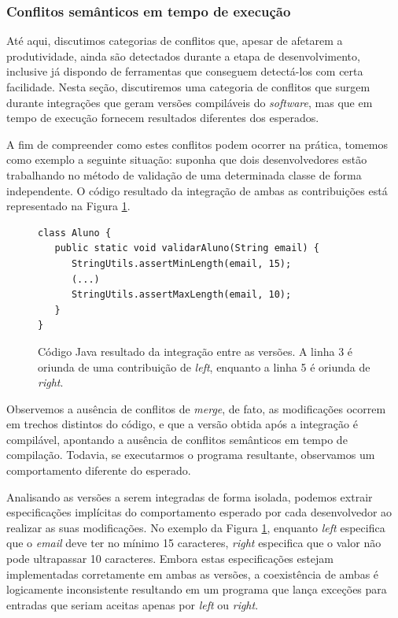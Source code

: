 \documentclass[12pt]{article}
\begin{document}
\subsubsection{Conflitos semânticos em tempo de execução}
Até aqui, discutimos categorias de conflitos que, apesar de afetarem a produtividade, ainda são detectados durante a etapa de desenvolvimento, inclusive já dispondo de ferramentas que conseguem detectá-los com certa facilidade. Nesta seção, discutiremos uma categoria de conflitos que surgem durante integrações que geram versões compiláveis do \textit{software}, mas que em tempo de execução fornecem resultados diferentes dos esperados.

A fim de compreender como estes conflitos podem ocorrer na prática, tomemos como exemplo a seguinte situação: suponha que dois desenvolvedores estão trabalhando no método de validação de uma determinada classe de forma independente. O código resultado da integração de ambas as contribuições está representado na Figura \ref{fig:dynamic1}.

\begin{figure}[H]
\begin{verbatim}
class Aluno {
   public static void validarAluno(String email) {
      StringUtils.assertMinLength(email, 15);
      (...)
      StringUtils.assertMaxLength(email, 10);
   }
}

\end{verbatim}
\caption{Código Java resultado da integração entre as versões. A linha 3 é oriunda de uma contribuição de \textit{left}, enquanto a linha 5 é oriunda de \textit{right}.}
\label{fig:dynamic1}
\end{figure}

Observemos a ausência de conflitos de \textit{merge}, de fato, as modificações ocorrem em trechos distintos do código, e que a versão obtida após a integração é compilável, apontando a ausência de conflitos semânticos em tempo de compilação. Todavia, se executarmos o programa resultante, observamos um comportamento diferente do esperado.
	
Analisando as versões a serem integradas de forma isolada, podemos extrair especificações implícitas do comportamento esperado por cada desenvolvedor ao realizar as suas modificações. No exemplo da Figura \ref{fig:dynamic1}, enquanto \textit{left} especifica que o \textit{email} deve ter no mínimo 15 caracteres, \textit{right} especifica que o valor não pode ultrapassar 10 caracteres. Embora estas especificações estejam implementadas corretamente em ambas as versões, a coexistência de ambas é logicamente inconsistente resultando em um programa que lança exceções para entradas que seriam aceitas apenas por \textit{left} ou \textit{right}.
\end{document}

